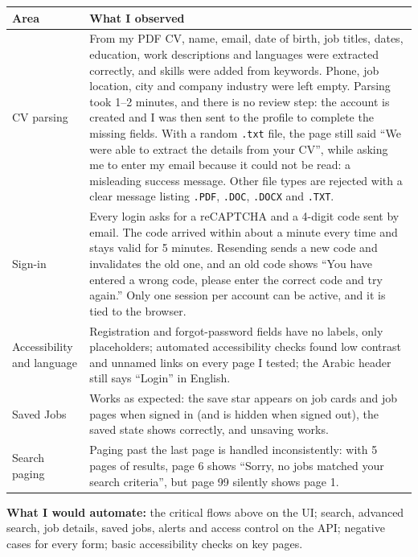 \documentclass[11pt,a4paper]{article}
\begin{document}
\begin{tabularx}{\linewidth}{@{}L{3.3cm}Y@{}}
\toprule
\textbf{Area} & \textbf{What I observed} \\
\midrule
CV parsing & From my PDF CV, name, email, date of birth, job titles, dates, education, work descriptions and
languages were extracted correctly, and skills were added from keywords. Phone, job location, city and company
industry were left empty. Parsing took 1--2 minutes, and there is no review step: the account is created and I was
then sent to the profile to complete the missing fields. With a random \texttt{.txt} file, the page still said
``We were able to extract the details from your CV'', while asking me to enter my email because it could not be
read: a misleading success message. Other file types are rejected with a clear message listing
\texttt{.PDF}, \texttt{.DOC}, \texttt{.DOCX} and \texttt{.TXT}. \\
Sign-in & Every login asks for a reCAPTCHA and a 4-digit code sent by email. The code arrived within about a minute
every time and stays valid for 5 minutes. Resending sends a new code and invalidates the old one, and an old code
shows ``You have entered a wrong code, please enter the correct code and try again.'' Only one session per account
can be active, and it is tied to the browser. \\
Accessibility and language & Registration and forgot-password fields have no labels, only placeholders; automated
accessibility checks found low contrast and unnamed links on every page I tested; the Arabic header still says
``Login'' in English. \\
Saved Jobs & Works as expected: the save star appears on job cards and job pages when signed in (and is hidden when
signed out), the saved state shows correctly, and unsaving works. \\
Search paging & Paging past the last page is handled inconsistently: with 5 pages of results, page 6 shows
``Sorry, no jobs matched your search criteria'', but page 99 silently shows page 1. \\
\bottomrule
\end{tabularx}

\textbf{What I would automate:} the critical flows above on the UI; search, advanced search, job details, saved
jobs, alerts and access control on the API; negative cases for every form; basic accessibility checks on key pages.
\end{document}
